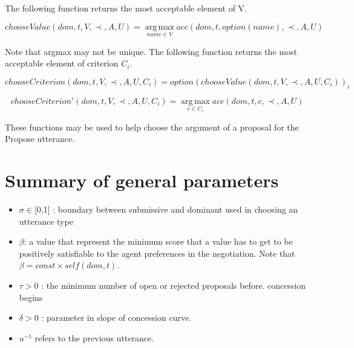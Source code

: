 \documentclass{article}
\begin{document}
	The following function returns the most acceptable element of V.

	 $$ chooseValue(dom, t, V, \prec, A, U) =	\operatorname*{arg\,max}_{name \in V} acc(dom, t, option(name), \prec, A, U) $$
	
	Note that argmax may not be unique.  The following function returns the most acceptable element of	criterion $C_i$.
	
	$$chooseCriterion(dom, t, V, \prec, A, U, C_i) = option(chooseValue(dom, t, V, \prec, A, U, C_i))_i$$
	

	$$chooseCriterion'(dom, t, V, \prec, A, U, C_i) =	\operatorname*{arg\,max}_{c\in C_i} acc(dom, t, c, \prec, A, U)$$
	
	These functions may be used to help choose the argument of a proposal for the Propose utterance.
	
	\section{Summary of general parameters }
	\begin{itemize}

		\item $\sigma \in $[0,1] : boundary between submissive and dominant used in
				choosing an utterance type
		\item $\beta$:  a value that represent the minimum score that a value has to get to be positively satisfiable to the agent preferences in the negotiation. Note that $\beta = const \times self(dom,t)$.
		\item $\tau > 0$ : the minimum number of open or rejected proposals before.
				concession begins
		\item $\delta > 0$ : parameter in slope of concession curve.
		\item $u^{-1}$ refers to the previous utterance.
		
		
	\end{itemize}

	
%	
%	
%	
	
\end{document}
